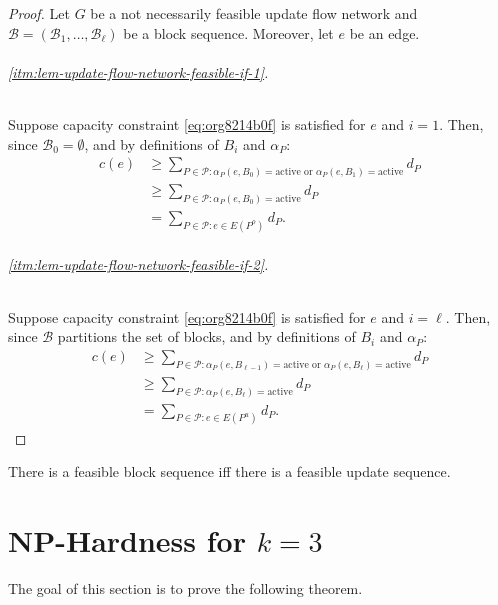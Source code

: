 \documentclass[fontsize=11pt,paper=a4]{book}
\begin{document}
\begin{proof}
Let \(G\) be a not necessarily feasible update flow network and \(\mathcal{B}=(\mathscr{B}_1,\dots,\mathscr{B}_{\ell})\) be a block sequence.
Moreover, let \(e\) be an edge.

\paragraph{\ref{itm:lem-update-flow-network-feasible-if-1}.}
Suppose capacity constraint \ref{eq:org8214b0f}  is satisfied for \(e\) and \(i=1\).
Then, since \(\mathscr{B}_0=\emptyset\), and by definitions of \(B_i\) and \(\alpha_P\):
\begin{align*}
c(e)
&\geq\sum_{P\in\mathcal{P}:\alpha_P(e,B_0)=\mathrm{active}\text{ or }\alpha_P(e,B_1)=\mathrm{active}}d_P\\
&\geq\sum_{P\in\mathcal{P}:\alpha_P(e,B_0)=\mathrm{active}}d_P\\
&=\sum_{P\in\mathcal{P}:e\in E(P^o)}d_P.
\end{align*}
\paragraph{\ref{itm:lem-update-flow-network-feasible-if-2}.}
Suppose capacity constraint \ref{eq:org8214b0f}  is satisfied for \(e\) and \(i=\ell\).
Then, since \(\mathcal{B}\) partitions the set of blocks, and by definitions of \(B_i\) and \(\alpha_P\):
\begin{align*}
c(e)
&\geq\sum_{P\in\mathcal{P}:\alpha_P(e,B_{\ell-1})=\mathrm{active}\text{ or }\alpha_P(e,B_{\ell})=\mathrm{active}}d_P\\
&\geq\sum_{P\in\mathcal{P}:\alpha_P(e,B_{\ell})=\mathrm{active}}d_P\\
&=\sum_{P\in\mathcal{P}:e\in E(P^u)}d_P.
\end{align*}
\end{proof}

\begin{corollary}
There is a feasible block sequence iff there is a feasible update sequence.
\label{org8c7cbdd}
\end{corollary}

\part{\(\textbf{NP}\)-Hardness for \(k=3\)}
\label{sec:org21620c8}

The goal of this section is to prove the following theorem.
\end{document}
